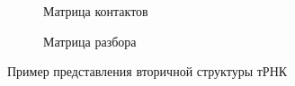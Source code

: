 \documentclass[14pt]{matmex-diploma-custom}
\begin{document}
\begin{figure}[h]
\begin{subfigure}{.3\textwidth}
  \caption{Матрица контактов}
  \label{struc_b}
\end{subfigure}
\begin{subfigure}{.3\textwidth}
  \centering
  \caption{Матрица разбора}
  \label{struc_c}
\end{subfigure}
\caption{Пример представления вторичной структуры тРНК}
\label{struc}
\end{figure}
\end{document}
